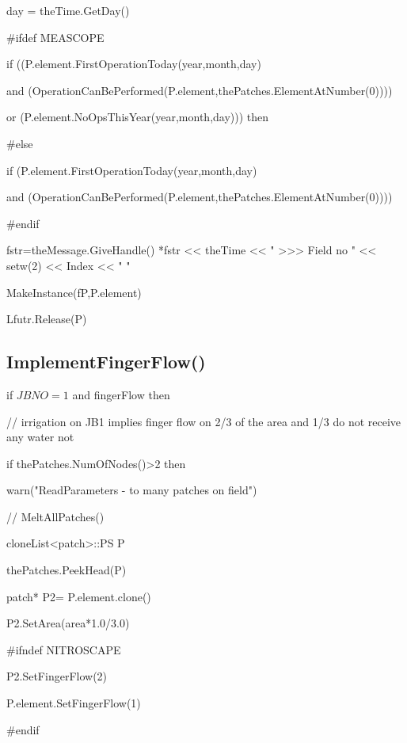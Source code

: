 \documentclass[%
]{scrartcl}
\begin{document}
{        \quad	 \quad	 \quad	      day = theTime.GetDay()
        
\#ifdef MEASCOPE

      \quad	 \quad	 \quad	      
 if ((P.element.FirstOperationToday(year,month,day) 
 
\quad and  (OperationCanBePerformed(P.element,thePatches.ElementAtNumber(0))))

 \quad            		 or  (P.element.NoOpsThisYear(year,month,day))) then
            		 
\#else

        \quad	 \quad	 \quad		     if (P.element.FirstOperationToday(year,month,day) 

\quad	 \quad	 \quad  and  (OperationCanBePerformed(P.element,thePatches.ElementAtNumber(0))))

\#endif
            

      \quad	 \quad	 \quad	 \quad	          fstr=theMessage.GiveHandle()
               *fstr << theTime << " >>> Field no " << setw(2) << Index << "  "

        \quad	 \quad	 \quad	 \quad	        MakeInstance(fP,P.element)
    
      \quad	 \quad	 \quad	 \quad	          Lfutr.Release(P)

   

\subsection{ImplementFingerFlow()}	
  if $JBNO=1$ and fingerFlow then 

 \quad	// irrigation on JB1 implies finger flow on 2/3 of the area and 1/3 do not receive any water not 
   
   
  \quad    if thePatches.NumOfNodes()>2 then
  
  \quad \quad     	 warn("ReadParameters - to many patches on field")
  
\quad //      MeltAllPatches()

 \quad   	cloneList<patch>::PS P
 
 \quad   	thePatches.PeekHead(P)
 
  \quad     patch* P2= P.element.clone()
  
 \quad      P2.SetArea(area*1.0/3.0)
 
\#ifndef NITROSCAPE

  \quad     P2.SetFingerFlow(2)
  
  \quad     P.element.SetFingerFlow(1)
  
\#endif

}
\end{document}
